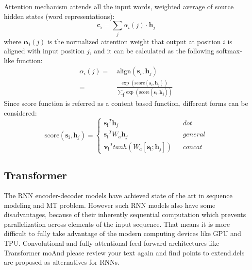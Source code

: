 Attention mechanism attends all the input words, weighted average of source hidden states (word representations):
\[ \bm{c}_i = \sum_{j} {\alpha}_i(j)\cdot  \bm{h}_j \]
where $\bm{\alpha}_i(j)$ is the normalized attention weight that output at position $i$ is aligned with input position $j$, and it can be calculated as the following softmax-like function:
\begin{align}
{\alpha}_i(j) = & \ \text{align}(\bm{s}_i, {\bm{h}}_j) \\
= & \ \frac{\text{exp\ }(\text{score}(\bm{s}_i, {\bm{h}}_j))}{\sum_{\bm{j}^{\prime}} \text{exp\ }(\text{score}(\bm{s}_i, {\bm{h}}_j^{\prime}))}
\end{align}
Since score function is referred as a content based function, different forms can be considered:
\begin{equation}
\text{score}(\bm{s_i}, {\bm{h}}_j)=\left\{
\begin{array}{lcl}
{\bm{s_i}}^T {\bm{h}}_j & & dot\\
{\bm{s_i}}^T W_a {\bm{h}}_j & & general\\
{\bm{v_i}}^T tanh(W_a[\bm{s_i}; {\bm{h}}_j]) & & concat
\end{array} \right.
\end{equation}





\subsection{Transformer}

The RNN encoder-decoder models have achieved state of the art in sequence modeling and MT problem. However such RNN models also have some disadvantages, because of their inherently sequential computation which prevents parallelization across elements of the input sequence. That means it is more difficult to fully take advantage of the modern computing devices like GPU and TPU. Convolutional \cite{gehring2017convolutional} and fully-attentional feed-forward architectures like Transformer \cite{vaswani2017attention} moAnd please review your text again and find points to extend.dels are proposed as alternatives for RNNs. \\

